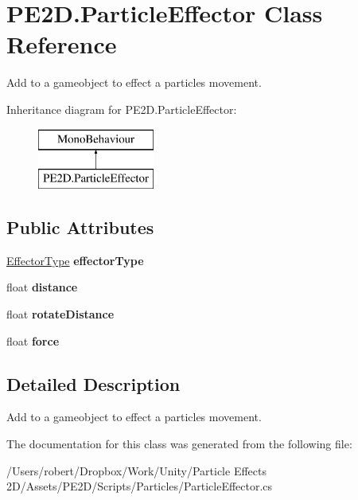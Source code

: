 \hypertarget{class_p_e2_d_1_1_particle_effector}{}\section{P\+E2\+D.\+Particle\+Effector Class Reference}
\label{class_p_e2_d_1_1_particle_effector}


Add to a gameobject to effect a particles movement.  


Inheritance diagram for P\+E2\+D.\+Particle\+Effector\+:\begin{figure}[H]
\begin{center}
\leavevmode
\includegraphics[height=2.000000cm]{class_p_e2_d_1_1_particle_effector}
\end{center}
\end{figure}
\subsection*{Public Attributes}
\begin{DoxyCompactItemize}
\item 
\hypertarget{class_p_e2_d_1_1_particle_effector_a2fa87e8c0ac248afe34841448bc2e265}{}\hyperlink{namespace_p_e2_d_a476bb8917ed61c9fea94f42486983a11}{Effector\+Type} {\bfseries effector\+Type}\label{class_p_e2_d_1_1_particle_effector_a2fa87e8c0ac248afe34841448bc2e265}

\item 
\hypertarget{class_p_e2_d_1_1_particle_effector_ac6db8f7e8b6e51bbef84f6ded5c811ea}{}float {\bfseries distance}\label{class_p_e2_d_1_1_particle_effector_ac6db8f7e8b6e51bbef84f6ded5c811ea}

\item 
\hypertarget{class_p_e2_d_1_1_particle_effector_a6f68fbe9b32953cef5517094684a673b}{}float {\bfseries rotate\+Distance}\label{class_p_e2_d_1_1_particle_effector_a6f68fbe9b32953cef5517094684a673b}

\item 
\hypertarget{class_p_e2_d_1_1_particle_effector_a0395c3e2e9c6e452338c800a17bd55d5}{}float {\bfseries force}\label{class_p_e2_d_1_1_particle_effector_a0395c3e2e9c6e452338c800a17bd55d5}

\end{DoxyCompactItemize}


\subsection{Detailed Description}
Add to a gameobject to effect a particles movement. 



The documentation for this class was generated from the following file\+:\begin{DoxyCompactItemize}
\item 
/\+Users/robert/\+Dropbox/\+Work/\+Unity/\+Particle Effects 2\+D/\+Assets/\+P\+E2\+D/\+Scripts/\+Particles/Particle\+Effector.\+cs\end{DoxyCompactItemize}
